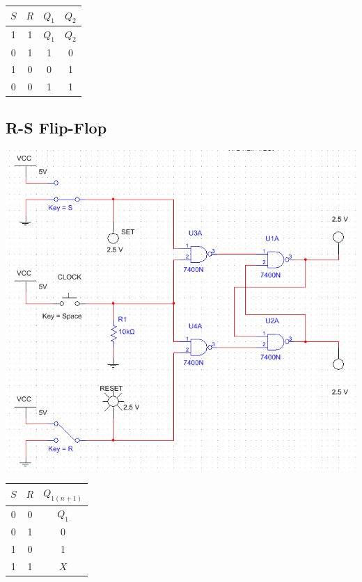 \documentclass{article}
\begin{document}
\begin{center}
\begin{tabular}{|c|c|c|c|}
	\hline
	$S$ & $R$ & $Q_1$ & $Q_2$ \\
	\hline
	1 & 1 & $Q_1$ & $Q_2$ \\
	0 & 1 & 1 & 0 \\
	1 & 0 & 0 & 1 \\
	0 & 0 & 1 & 1 \\
	\hline
\end{tabular}
\end{center}

\subsection{R-S Flip-Flop}
\includegraphics[width=\textwidth]{./res/rsff.png}

\begin{center}
\begin{tabular}{|c|c|c|}
	\hline
	$S$ & $R$ & $Q_{1(n+1)}$ \\
	\hline
	0 & 0 & $Q_1$ \\
	0 & 1 & 0 \\
	1 & 0 & 1 \\
	1 & 1 & $X$ \\
	\hline
\end{tabular}
\end{center}
\end{document}
